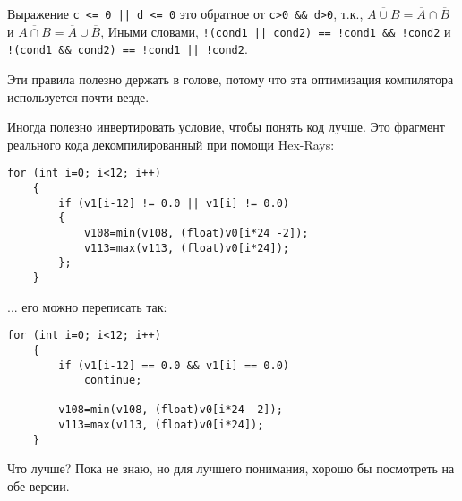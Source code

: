 Выражение \verb~c <= 0 || d <= 0~ это обратное от \verb|c>0 && d>0|, т.к.,
$\overline{A \cup B} = \overline{A} \cap \overline{B}$ и
$\overline{A \cap B} = \overline{A} \cup \overline{B}$,
Иными словами,
\verb~!(cond1 || cond2) == !cond1 && !cond2~ и 
\verb~!(cond1 && cond2) == !cond1 || !cond2~.

Эти правила полезно держать в голове, потому что эта оптимизация компилятора используется почти везде.

Иногда полезно инвертировать условие, чтобы понять код лучше.
Это фрагмент реального кода декомпилированный при помощи Hex-Rays:

\begin{lstlisting}[style=customc]
	for (int i=0; i<12; i++)
	{
		if (v1[i-12] != 0.0 || v1[i] != 0.0)
		{
			v108=min(v108, (float)v0[i*24 -2]);
			v113=max(v113, (float)v0[i*24]);
		};
	}
\end{lstlisting}

... его можно переписать так:

\begin{lstlisting}[style=customc]
	for (int i=0; i<12; i++)
	{
		if (v1[i-12] == 0.0 && v1[i] == 0.0)
			continue;

		v108=min(v108, (float)v0[i*24 -2]);
		v113=max(v113, (float)v0[i*24]);
	}
\end{lstlisting}

Что лучше? Пока не знаю, но для лучшего понимания, хорошо бы посмотреть на обе версии.

